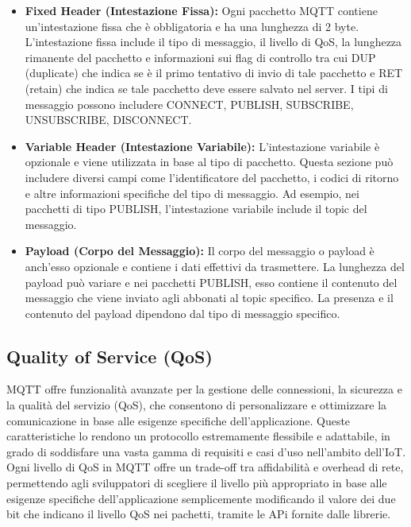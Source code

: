 \documentclass[12pt,a4paper,openright,twoside]{book}
\begin{document}
\begin{itemize}
\item \textbf{Fixed Header (Intestazione Fissa):} Ogni pacchetto MQTT contiene un'intestazione fissa che è obbligatoria e ha una lunghezza di 2 byte. 
L'intestazione fissa include il tipo di messaggio, il livello di \ac{QoS}, la lunghezza rimanente del pacchetto e informazioni sui flag di controllo
tra cui DUP (duplicate) che indica se è il primo tentativo di invio di tale pacchetto e RET (retain) che indica se tale pacchetto deve essere salvato nel server.
I tipi di messaggio possono includere CONNECT, PUBLISH, SUBSCRIBE, UNSUBSCRIBE, DISCONNECT.
\item \textbf{Variable Header (Intestazione Variabile):} L'intestazione variabile è opzionale e viene utilizzata in base al tipo di pacchetto. 
Questa sezione può includere diversi campi come l'identificatore del pacchetto, i codici di ritorno e altre informazioni specifiche del tipo di messaggio. 
Ad esempio, nei pacchetti di tipo PUBLISH, l'intestazione variabile include il topic del messaggio.
\item \textbf{Payload (Corpo del Messaggio):} Il corpo del messaggio o payload è anch'esso opzionale e contiene i dati effettivi da trasmettere. 
La lunghezza del payload può variare e nei pacchetti PUBLISH, esso contiene il contenuto del messaggio che viene inviato agli abbonati al topic specifico. 
La presenza e il contenuto del payload dipendono dal tipo di messaggio specifico.
\end{itemize}

\subsection{Quality of Service (QoS)}

\ac{MQTT} offre funzionalità avanzate per la gestione delle connessioni, la sicurezza e la qualità del servizio (\ac{QoS}), che consentono di personalizzare e ottimizzare 
la comunicazione in base alle esigenze specifiche dell'applicazione. Queste caratteristiche lo rendono un protocollo estremamente flessibile e adattabile, 
in grado di soddisfare una vasta gamma di requisiti e casi d'uso nell'ambito dell'\ac{IoT}. 
Ogni livello di \ac{QoS} in MQTT offre un trade-off tra affidabilità e overhead di rete, permettendo agli sviluppatori di scegliere il livello più appropriato in base alle esigenze 
specifiche dell'applicazione semplicemente modificando il valore dei due bit che indicano il livello QoS nei pachetti, tramite le APi fornite dalle librerie. 
\end{document}
